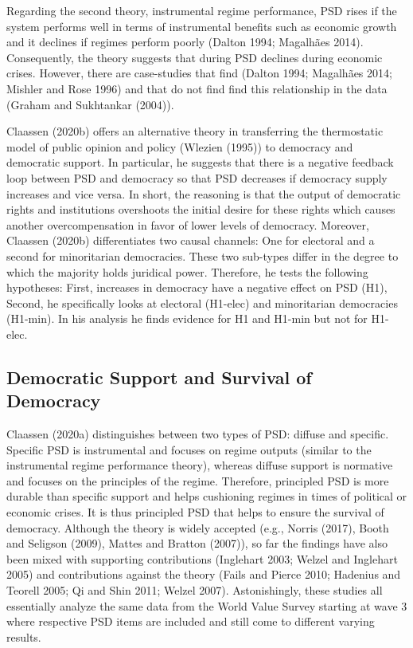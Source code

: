 \documentclass[12pt,english,a4paper,oneside]{article}
\theoremstyle{definition}
\theoremstyle{definition}
\theoremstyle{definition}
\theoremstyle{definition}
\theoremstyle{remark}
\begin{document}
Regarding the second theory, instrumental regime performance, PSD rises if the system performs well in terms of instrumental benefits such as economic growth and it declines if regimes perform poorly (Dalton 1994; Magalhães 2014). Consequently, the theory suggests that during PSD declines during economic crises. However, there are case-studies that find (Dalton 1994; Magalhães 2014; Mishler and Rose 1996) and that do not find find this relationship in the data (Graham and Sukhtankar (2004)).

Claassen (2020b) offers an alternative theory in transferring the thermostatic model of public opinion and policy (Wlezien (1995)) to democracy and democratic support. In particular, he suggests that there is a negative feedback loop between PSD and democracy so that PSD decreases if democracy supply increases and vice versa. In short, the reasoning is that the output of democratic rights and institutions overshoots the initial desire for these rights which causes another overcompensation in favor of lower levels of democracy. Moreover, Claassen (2020b) differentiates two causal channels: One for electoral and a second for minoritarian democracies. These two sub-types differ in the degree to which the majority holds juridical power. Therefore, he tests the following hypotheses: First, increases in democracy have a negative effect on PSD (H1), Second, he specifically looks at electoral (H1-elec) and minoritarian democracies (H1-min). In his analysis he finds evidence for H1 and H1-min but not for H1-elec.

\hypertarget{democratic-support-and-survival-of-democracy}{%
\subsection{Democratic Support and Survival of Democracy}\label{democratic-support-and-survival-of-democracy}}

Claassen (2020a) distinguishes between two types of PSD: diffuse and specific. Specific PSD is instrumental and focuses on regime outputs (similar to the instrumental regime performance theory), whereas diffuse support is normative and focuses on the principles of the regime. Therefore, principled PSD is more durable than specific support and helps cushioning regimes in times of political or economic crises. It is thus principled PSD that helps to ensure the survival of democracy. Although the theory is widely accepted (e.g., Norris (2017), Booth and Seligson (2009), Mattes and Bratton (2007)), so far the findings have also been mixed with supporting contributions (Inglehart 2003; Welzel and Inglehart 2005) and contributions against the theory (Fails and Pierce 2010; Hadenius and Teorell 2005; Qi and Shin 2011; Welzel 2007). Astonishingly, these studies all essentially analyze the same data from the World Value Survey starting at wave 3 where respective PSD items are included and still come to different varying results.
\end{document}
